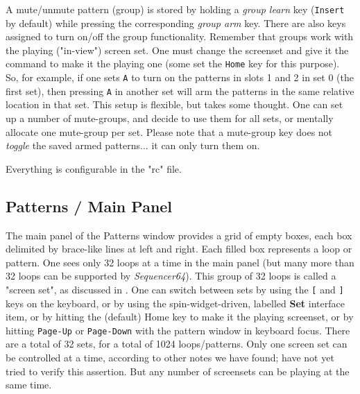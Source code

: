    A mute/unmute pattern (group) is stored by holding a
   \textsl{group learn} key (\texttt{Insert} by default) while pressing the
   corresponding \textsl{group arm} key.
   There are also keys assigned to turn on/off the group functionality.
   Remember that groups work with the playing ("in-view") screen set.
   One must change the screenset and give it the command to make it the
   playing one
   (some set the \texttt{Home} key for this purpose).
   So, for example, if one sets \texttt{A} to turn on the
   patterns in slots 1 and 2 in set 0 (the first set), then pressing
   \texttt{A} in another set will arm the patterns in the same relative
   location in that set.
   This setup is flexible, but takes some thought.
   One can set up a number of mute-groups, and decide to use them
   for all sets, or mentally allocate one mute-group per set.
   Please note that a mute-group key does not \textsl{toggle} the saved
   armed patterns... it can only turn them on.

   Everything is configurable in the "rc" file.

\subsection{Patterns / Main Panel}
\label{subsec:seq64_patterns_panel_main}

   The main panel of the Patterns window provides a grid of empty boxes,
   each box delimited by brace-like lines at left and right.
   Each filled box represents a loop or pattern.
   One sees only 32 loops at a time in the main panel (but many more than
   32 loops can be supported by \textsl{Sequencer64}).
   This group of 32 loops is called a "screen set", as discussed in
   .
   One can switch between sets by using the
   \index{keys![}
   \texttt{[} and
   \index{keys!]}
   \texttt{]} keys on the keyboard, or by using
   the spin-widget-driven, labelled \textbf{Set} interface item, or
   by hitting the (default) Home key to make it the playing screenset,
   or by hitting \texttt{Page-Up} or \texttt{Page-Down} with the pattern window
   in keyboard focus.
   There are a total of 32 sets, for a total of 1024 loops/patterns. 
   Only one screen set can be controlled at a time, according to other notes we
   have found; have not yet tried to verify this assertion.  But any number of
   screensets can be playing at the same time.

